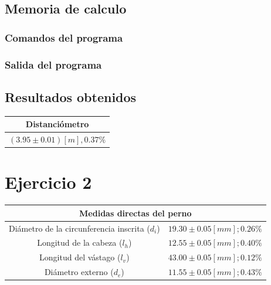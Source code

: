 \documentclass[letter,11pt]{article}
\begin{document}
\subsection{Memoria de calculo}

\subsubsection{Comandos del programa}
\begin{alltt}
\footnotesize

\normalsize
\end{alltt}

\subsubsection{Salida del programa}
\begin{alltt}
\footnotesize

\normalsize
\end{alltt}

\subsection{Resultados obtenidos}

\begin{center}
\begin{tabular}{|c|c|}
\hline
\multicolumn{2}{|c|}{\textbf{Distanciómetro}} \\
\hline
\multicolumn{2}{|c|}{$(3.95\pm0.01)[m], 0.37\%$} \\
\hline
\end{tabular}
\end{center}

\section{Ejercicio 2}

\begin{center}
\begin{tabular}{|c|>{\centering}m{5.0cm}<{\centering}|}
\hline
\multicolumn{2}{|c|}{\textbf{Medidas directas del perno}}
\tabularnewline \hline
Diámetro de la circunferencia inscrita ($d_i$) & $19.30 \pm 0.05 [mm]; 0.26\%$
\tabularnewline \hline
                 Longitud de la cabeza ($l_h$) & $12.55 \pm 0.05 [mm]; 0.40\%$
\tabularnewline \hline
                  Longitud del vástago ($l_v$) & $43.00 \pm 0.05 [mm]; 0.12\%$
\tabularnewline \hline
                      Diámetro externo ($d_e$) & $11.55 \pm 0.05 [mm]; 0.43\%$
\tabularnewline \hline
\end{tabular}
\end{center}
\end{document}
